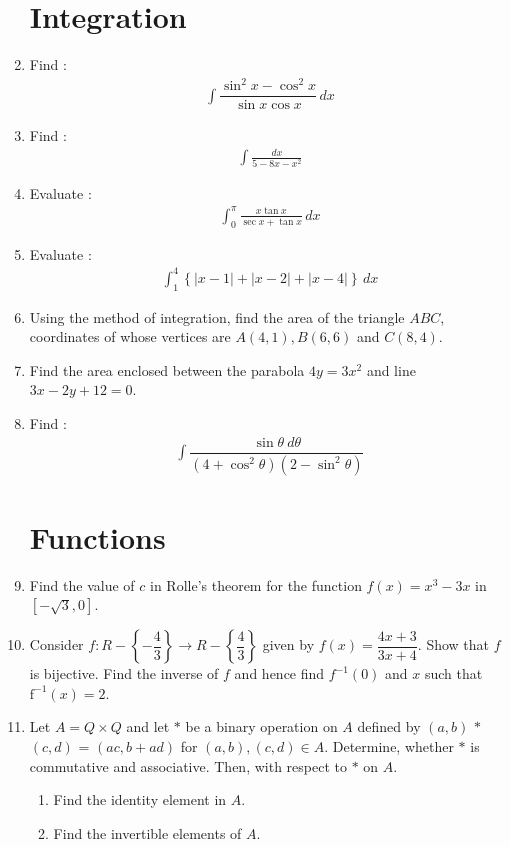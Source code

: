 \documentclass{article}
\providecommand{\cbrak}[1]{\ensuremath{\left\{#1\right\}}}
\providecommand{\brak}[1]{\ensuremath{\left(#1\right)}}
\providecommand{\rbrak}[1]{\ensuremath{\left[#1\right]}}
\begin{document}
\begin{enumerate}
\section{Integration}
\item Find :\begin{align*} \int \dfrac{\sin ^2 x-\cos ^2 x}{\sin x \cos x}\,dx\end{align*}
\item Find :\begin{align*}\int\frac{dx}{5-8 x-x^2}\end{align*}
\item Evaluate :\begin{align*}\int_0^\pi \frac{x \tan x}{\sec x+\tan x} \, dx\end{align*}
\item Evaluate :\begin{align*}\int_1^4\cbrak{|x-1|+|x-2|+|x-4|}\, dx\end{align*}
\item Using the method of integration, find the area of the triangle $ABC$, coordinates of whose vertices are $A\brak{4,1},B\brak{6,6}$ and $C\brak{8,4}$.
\item Find the area enclosed between the parabola $4y=3x^2$ and line $3x-2y+12=0$.
\item Find :\begin{align*}\int\dfrac{\sin\theta ~d\theta}{\brak{4+\cos^{2}\theta}\brak{2-\sin^{2}\theta}}\end{align*}
\section{Functions}
\item Find the value of $c$ in Rolle's theorem for the function $f\brak{x}=x^3-3 x$ in $\rbrak{-\sqrt{3}, 0}$.
\item Consider $f:R-\cbrak{-\dfrac{4}{3}}\rightarrow R-\cbrak{\dfrac{4}{3}}$ given by $f\brak{x}=\dfrac{4x+3}{3x+4}$. Show that $f$ is bijective. Find the inverse of $f$ and hence find $f^{-1}\brak{0}$ and $x$ such that $\mathrm{f}^{-1}\brak{x}=2$.
\item Let $A =Q \times Q$ and let $\ast$ be  a binary operation on $A$ defined by $\brak{a, b}$  $\ast$  $\brak{c, d}$ = $\brak{{a}{c}, b + {a}{d}}$ for $\brak{a, b}, \brak{c, d} \in A$. Determine, whether $\ast$ is commutative and associative. Then, with respect to $\ast$ on  $A$.
	\begin{enumerate}
		\item Find the identity element in $A$.
		\item Find the invertible elements of $A$.
	\end{enumerate}

\end{enumerate}
\end{document}
